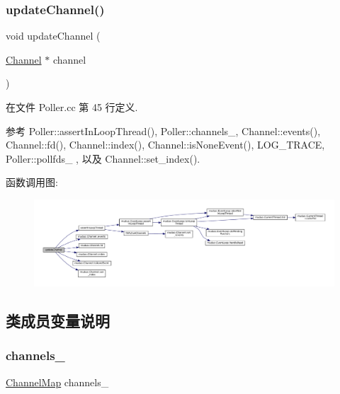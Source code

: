 \subsubsection{\texorpdfstring{update\+Channel()}{updateChannel()}}
{\footnotesize\ttfamily void update\+Channel (\begin{DoxyParamCaption}\item[{\hyperlink{classmuduo_1_1Channel}{Channel} $\ast$}]{channel }\end{DoxyParamCaption})}



在文件 Poller.\+cc 第 45 行定义.



参考 Poller\+::assert\+In\+Loop\+Thread(), Poller\+::channels\+\_\+, Channel\+::events(), Channel\+::fd(), Channel\+::index(), Channel\+::is\+None\+Event(), L\+O\+G\+\_\+\+T\+R\+A\+CE, Poller\+::pollfds\+\_\+ , 以及 Channel\+::set\+\_\+index().

函数调用图\+:
\nopagebreak
\begin{figure}[H]
\begin{center}
\leavevmode
\includegraphics[width=350pt]{classmuduo_1_1Poller_acaa4a191936aacf608d279a6f343d533_cgraph}
\end{center}
\end{figure}


\subsection{类成员变量说明}
\mbox{\label{classmuduo_1_1Poller_aca6f39ba1cb9dbdd28edf2291d1b4fd5}} 
\subsubsection{\texorpdfstring{channels\+\_\+}{channels\_}}
{\footnotesize\ttfamily \hyperlink{classmuduo_1_1Poller_a950db725d18ce33d8457ae784380a07e}{Channel\+Map} channels\+\_\+\hspace{0.3cm}{\ttfamily [private]}}



